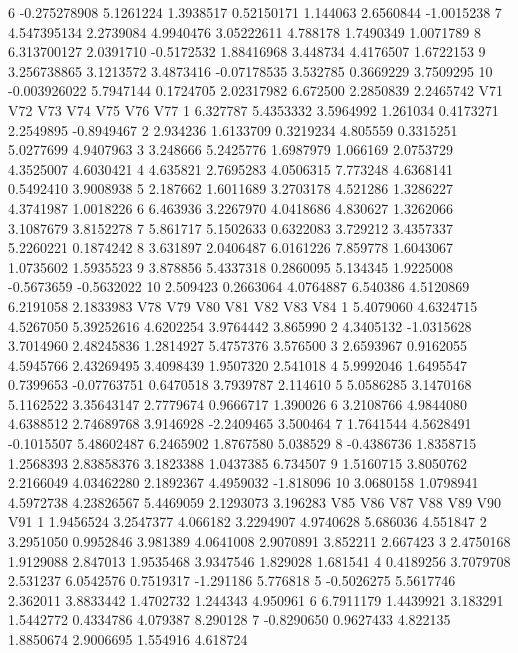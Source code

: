 \documentclass[12pt]{article}
\begin{document}
\begin{Schunk}
\begin{Soutput}
6  -0.275278908  5.1261224  1.3938517  0.52150171 1.144063 2.6560844 -1.0015238
7   4.547395134  2.2739084  4.9940476  3.05222611 4.788178 1.7490349  1.0071789
8   6.313700127  2.0391710 -0.5172532  1.88416968 3.448734 4.4176507  1.6722153
9   3.256738865  3.1213572  3.4873416 -0.07178535 3.532785 0.3669229  3.7509295
10 -0.003926022  5.7947144  0.1724705  2.02317982 6.672500 2.2850839  2.2465742
        V71       V72       V73      V74       V75        V76        V77
1  6.327787 5.4353332 3.5964992 1.261034 0.4173271  2.2549895 -0.8949467
2  2.934236 1.6133709 0.3219234 4.805559 0.3315251  5.0277699  4.9407963
3  3.248666 5.2425776 1.6987979 1.066169 2.0753729  4.3525007  4.6030421
4  4.635821 2.7695283 4.0506315 7.773248 4.6368141  0.5492410  3.9008938
5  2.187662 1.6011689 3.2703178 4.521286 1.3286227  4.3741987  1.0018226
6  6.463936 3.2267970 4.0418686 4.830627 1.3262066  3.1087679  3.8152278
7  5.861717 5.1502633 0.6322083 3.729212 3.4357337  5.2260221  0.1874242
8  3.631897 2.0406487 6.0161226 7.859778 1.6043067  1.0735602  1.5935523
9  3.878856 5.4337318 0.2860095 5.134345 1.9225008 -0.5673659 -0.5632022
10 2.509423 0.2663064 4.0764887 6.540386 4.5120869  6.2191058  2.1833983
          V78        V79        V80         V81       V82        V83       V84
1   5.4079060  4.6324715  4.5267050  5.39252616 4.6202254  3.9764442  3.865990
2   4.3405132 -1.0315628  3.7014960  2.48245836 1.2814927  5.4757376  3.576500
3   2.6593967  0.9162055  4.5945766  2.43269495 3.4098439  1.9507320  2.541018
4   5.9992046  1.6495547  0.7399653 -0.07763751 0.6470518  3.7939787  2.114610
5   5.0586285  3.1470168  5.1162522  3.35643147 2.7779674  0.9666717  1.390026
6   3.2108766  4.9844080  4.6388512  2.74689768 3.9146928 -2.2409465  3.500464
7   1.7641544  4.5628491 -0.1015507  5.48602487 6.2465902  1.8767580  5.038529
8  -0.4386736  1.8358715  1.2568393  2.83858376 3.1823388  1.0437385  6.734507
9   1.5160715  3.8050762  2.2166049  4.03462280 2.1892367  4.4959032 -1.818096
10  3.0680158  1.0798941  4.5972738  4.23826567 5.4469059  2.1293073  3.196283
          V85       V86      V87       V88        V89       V90      V91
1   1.9456524 3.2547377 4.066182 3.2294907  4.9740628  5.686036 4.551847
2   3.2951050 0.9952846 3.981389 4.0641008  2.9070891  3.852211 2.667423
3   2.4750168 1.9129088 2.847013 1.9535468  3.9347546  1.829028 1.681541
4   0.4189256 3.7079708 2.531237 6.0542576  0.7519317 -1.291186 5.776818
5  -0.5026275 5.5617746 2.362011 3.8833442  1.4702732  1.244343 4.950961
6   6.7911179 1.4439921 3.183291 1.5442772  0.4334786  4.079387 8.290128
7  -0.8290650 0.9627433 4.822135 1.8850674  2.9006695  1.554916 4.618724

\end{Soutput}
\end{Schunk}
\end{document}

